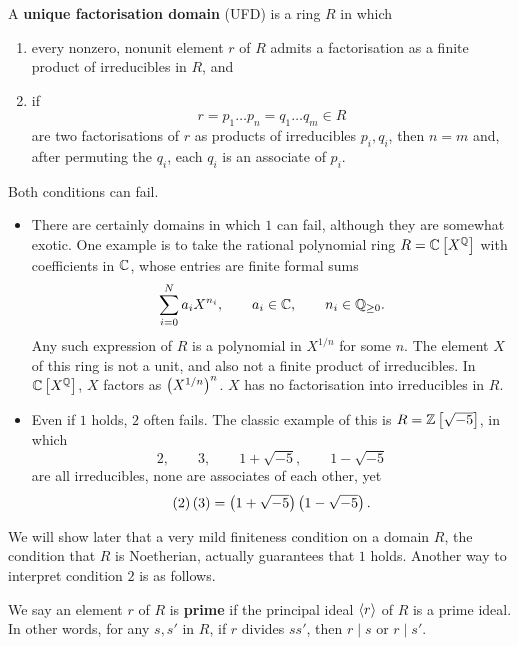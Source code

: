 \begin{definition}
A \textbf{unique factorisation domain} (UFD) is a ring $ R $ in which
\begin{enumerate}
\item every nonzero, nonunit element $ r $ of $ R $ admits a factorisation as a finite product of irreducibles in $ R $, and
\item if
$$ r = p_1 \dots p_n = q_1 \dots q_m \in R $$
are two factorisations of $ r $ as products of irreducibles $ p_i, q_i $, then $ n = m $ and, after permuting the $ q_i $, each $ q_i $ is an associate of $ p_i $.
\end{enumerate}
\end{definition}

Both conditions can fail.

\begin{example2}
\hfill
\begin{itemize}
\item There are certainly domains in which $ 1 $ can fail, although they are somewhat exotic. One example is to take the rational polynomial ring $ R = \mathbb{C}\left[ X^{\mathbb{Q}} \right] $ with coefficients in $ \mathbb{C} $, whose entries are finite formal sums
$$ \sum_{i = 0}^N a_iX^{n_i}, \qquad a_i \in \mathbb{C}, \qquad n_i \in \mathbb{Q}_{\ge 0}. $$
Any such expression of $ R $ is a polynomial in $ X^{1 / n} $ for some $ n $. The element $ X $ of this ring is not a unit, and also not a finite product of irreducibles. In $ \mathbb{C}\left[ X^{\mathbb{Q}} \right] $, $ X $ factors as $ \left( X^{1 / n} \right)^n $. $ X $ has no factorisation into irreducibles in $ R $.
\item Even if $ 1 $ holds, $ 2 $ often fails. The classic example of this is $ R = \mathbb{Z}\left[ \sqrt{-5} \right] $, in which
$$ 2, \qquad 3, \qquad 1 + \sqrt{-5}, \qquad 1 - \sqrt{-5} $$
are all irreducibles, none are associates of each other, yet
$$ \left( 2 \right)\left( 3 \right) = \left( 1 + \sqrt{-5} \right)\left( 1 - \sqrt{-5} \right). $$
\end{itemize}
\end{example2}

We will show later that a very mild finiteness condition on a domain $ R $, the condition that $ R $ is Noetherian, actually guarantees that $ 1 $ holds. Another way to interpret condition $ 2 $ is as follows.

\begin{definition}
We say an element $ r $ of $ R $ is \textbf{prime} if the principal ideal $ \left\langle r \right\rangle $ of $ R $ is a prime ideal. In other words, for any $ s, s' $ in $ R $, if $ r $ divides $ ss' $, then $ r \mid s $ or $ r \mid s' $.
\end{definition}

